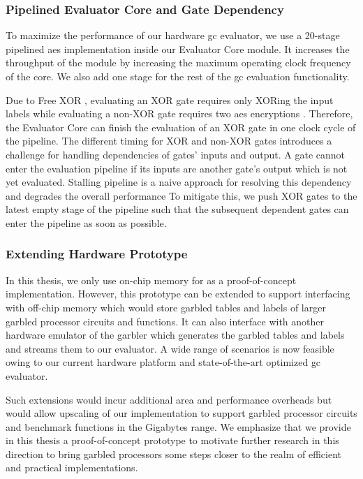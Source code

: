 \subsubsection{Pipelined Evaluator Core and Gate Dependency} \label{ssec:processor-hardware-pipeline}
To maximize the performance of our hardware \acrshort{gc} evaluator, we use a 20-stage pipelined \acrshort{aes} implementation \cite{hsing2013tiny} inside our Evaluator Core module.
It increases the throughput of the module by increasing the maximum operating clock frequency of the core.
We also add one stage for the rest of the \acrshort{gc} evaluation functionality.

Due to Free XOR \cite{kolesnikov2008improved}, evaluating an XOR gate requires only XORing the input labels while evaluating a non-XOR gate requires two \acrshort{aes} encryptions \cite{zahur2015two}.
Therefore, the Evaluator Core can finish the evaluation of an XOR gate in one clock cycle of the pipeline.
The different timing for XOR and non-XOR gates introduces a challenge for handling dependencies of gates' inputs and output.
A gate cannot enter the evaluation pipeline if its inputs are another gate's output which is not yet evaluated.
Stalling pipeline is a naive approach for resolving this dependency and degrades the overall performance
To mitigate this, we push XOR gates to the latest empty stage of the pipeline such that the subsequent dependent gates can enter the pipeline as soon as possible.

\subsubsection{Extending Hardware Prototype} \label{ssec:processor-hardware-extend}
In this thesis, we only use on-chip memory for as a proof-of-concept implementation.
However, this prototype can be extended to support interfacing with off-chip memory which would store garbled tables and labels of larger garbled processor circuits and functions.
It can also interface with another hardware emulator of the garbler which generates the garbled tables and labels and streams them to our evaluator.
A wide range of scenarios is now feasible owing to our current hardware platform and state-of-the-art optimized \acrshort{gc} evaluator.

Such extensions would incur additional area and performance overheads but would allow upscaling of our implementation to support garbled processor circuits and benchmark functions in the Gigabytes range.
We emphasize that we provide in this thesis a proof-of-concept prototype to motivate further research in this direction to bring garbled processors some steps closer to the realm of efficient and practical implementations.

